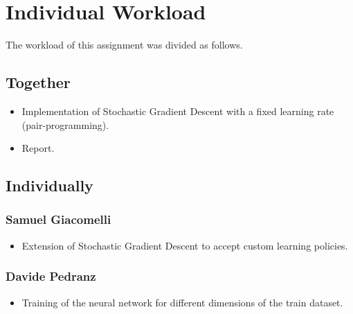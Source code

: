 \section{Individual Workload}
The workload of this assignment was divided as follows.

\subsection{Together}
\begin{itemize}
    \item Implementation of Stochastic Gradient Descent with a fixed learning rate (pair-programming).
    \item Report.
\end{itemize}

\subsection{Individually}
\subsubsection{Samuel Giacomelli}
\begin{itemize}
    \item Extension of Stochastic Gradient Descent to accept custom learning policies.
\end{itemize}
\subsubsection{Davide Pedranz}
\begin{itemize}
    \item Training of the neural network for different dimensions of the train dataset.
\end{itemize}
